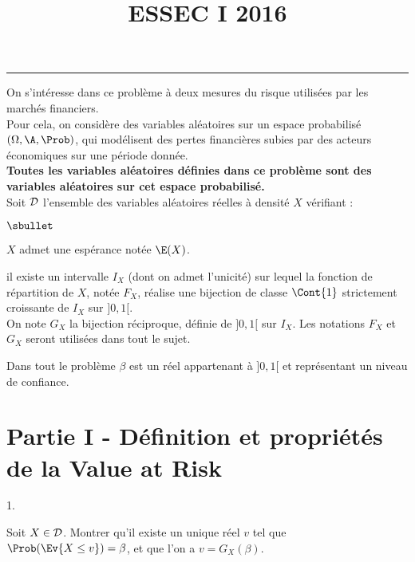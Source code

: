 \documentclass[11pt]{article}%
\title{\bf \vspace{-1.6cm} ESSEC I 2016} %
\author{} %
\date{} %
\begin{document}
\maketitle %
\vspace{-1.2cm}\hrule %
\thispagestyle{fancy}

\vspace*{.4cm}


\noindent
On s'intéresse dans ce problème à deux mesures du risque utilisées 
par les marchés financiers.\\
Pour cela, on considère des variables aléatoires sur un espace 
probabilisé $(\Omega,\A,\Prob)$, qui modélisent des pertes 
financières subies par des acteurs économiques sur une période donnée.\\
{\bf Toutes les variables aléatoires définies dans ce problème 
sont des variables aléatoires sur cet espace probabilisé.}\\
Soit ${\cal D}$ l'ensemble des variables aléatoires réelles à 
densité $X$ vérifiant :
\begin{noliste}{$\sbullet$}
  \item $X$ admet une espérance notée $\E(X)$.
  \item il existe un intervalle $I_X$ (dont on admet 
  l'unicité) sur lequel la fonction de répartition de $X$, notée 
  $F_X$, réalise une bijection de classe $\Cont{1}$ strictement 
  croissante de $I_X$ sur $]0,1[$.\\
  On note $G_X$ la bijection réciproque, définie de $]0,1[$ sur 
  $I_X$. Les notations $F_X$ et $G_X$ seront utilisées dans tout 
  le sujet.
\end{noliste}
Dans tout le problème $\beta$ est un réel appartenant à $]0,1[$ et 
représentant un niveau de confiance.

\section*{Partie I - Définition et propriétés de la \og Value at 
Risk \fg}

\begin{noliste}{1.}
  \setlength{\itemsep}{4mm}
  \item Soit $X \in {\cal D}$. Montrer qu'il existe un unique réel 
  $v$ tel que $\Prob(\Ev{X \leq v})=\beta$, et que l'on a 
  $v=G_X(\beta)$.
  
  

\end{noliste}
\end{document}
